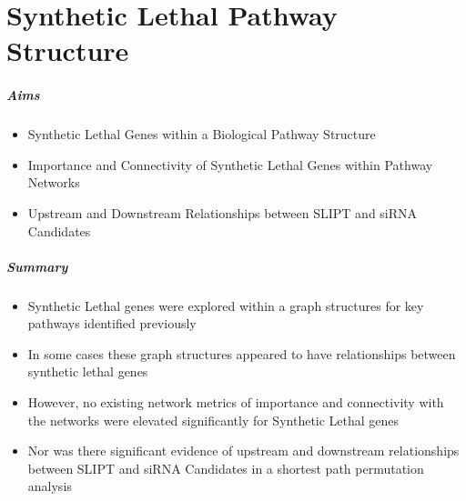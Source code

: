\chapter{Synthetic Lethal Pathway Structure}
\label{chap:Pathways}


\paragraph{Aims}

  \begin{itemize}
   \item Synthetic Lethal Genes within a Biological Pathway Structure
   
   \bigskip
   
   \item Importance and Connectivity of Synthetic Lethal Genes within Pathway Networks
   
   \bigskip
   
   \item Upstream and Downstream Relationships between SLIPT and siRNA Candidates
  \end{itemize}

\paragraph{Summary}

  \begin{itemize}
   \item Synthetic Lethal genes were explored within a graph structures for key pathways identified previously 
   
   \bigskip
   
   \item In some cases these graph structures appeared to have relationships between synthetic lethal genes  
   
   \bigskip
   
   \item However, no existing network metrics of importance and connectivity with the networks were elevated significantly for Synthetic Lethal genes
   
   \bigskip
   
   \item Nor was there significant evidence of upstream and downstream relationships between SLIPT and siRNA Candidates in a shortest path permutation analysis
  \end{itemize}
  
\clearpage
  
